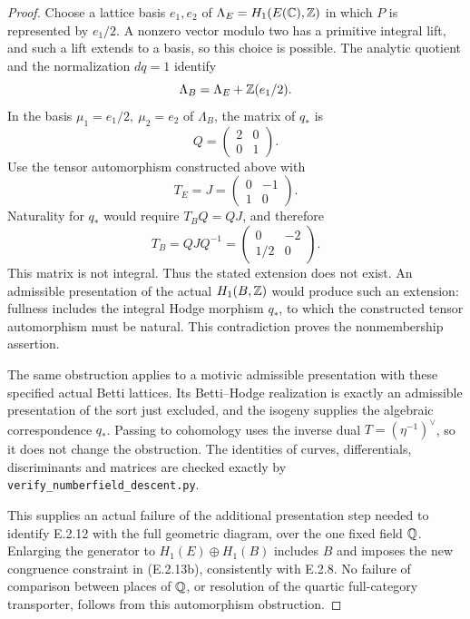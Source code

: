 \begin{proof}
Choose a lattice basis \(e_1,e_2\) of
\(\Lambda_E=H_1(E(\mathbb C),\mathbb Z)\) in which \(P\) is represented by
\(e_1/2\). A nonzero vector modulo two has a primitive integral
lift, and such a lift extends to a basis, so this choice is possible.
The analytic quotient and the normalization \(dq=1\) identify
\[
 \Lambda_B=\Lambda_E+\mathbb Z(e_1/2).
\]
In the basis \(\mu_1=e_1/2,\ \mu_2=e_2\) of \(\Lambda_B\), the
matrix of \(q_*\) is
\[
 Q=\begin{pmatrix}2&0\\0&1\end{pmatrix}.
\]
Use the tensor automorphism constructed above with
\[
 T_E=J=\begin{pmatrix}0&-1\\1&0\end{pmatrix}.
\]
Naturality for \(q_*\) would require \(T_BQ=QJ\), and therefore
\[
 T_B=QJQ^{-1}
    =\begin{pmatrix}0&-2\\1/2&0\end{pmatrix}.
 \tag{E.2.13b}
\]
This matrix is not integral. Thus the stated extension does not
exist. An admissible presentation of the actual \(H_1(B,\mathbb Z)\)
would produce such an extension: fullness includes the integral
Hodge morphism \(q_*\), to which the constructed tensor
automorphism must be natural. This contradiction proves the
nonmembership assertion.

The same obstruction applies to a motivic admissible presentation
with these specified actual Betti lattices. Its Betti--Hodge
realization is exactly an admissible presentation of the sort just
excluded, and the isogeny supplies the algebraic correspondence
\(q_*\). Passing to cohomology uses the inverse dual
\(T=(\eta^{-1})^\vee\), so it does not change the obstruction.
The identities of curves, differentials, discriminants and matrices
are checked exactly by \texttt{verify\_numberfield\_descent.py}.

This supplies an actual failure of the additional presentation
step needed to identify E.2.12 with the full geometric diagram,
over the one fixed field \(\mathbb Q\). Enlarging the generator to
\(H_1(E)\oplus H_1(B)\) includes \(B\) and imposes the new
congruence constraint in (E.2.13b), consistently with E.2.8.
No failure of comparison between places of \(\mathbb Q\), or resolution
of the quartic full-category transporter, follows from this
automorphism obstruction.
\end{proof}

